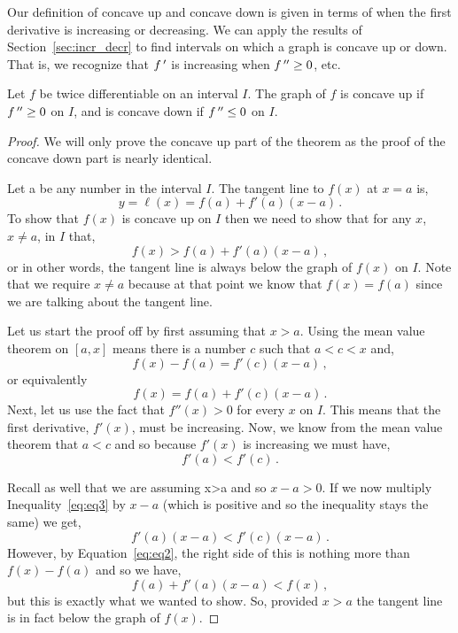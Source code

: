 Our definition of concave up and concave down is given in terms of when the first derivative is increasing or decreasing. We can apply the results of Section~\ref{sec:incr_decr} to find intervals on which a graph is concave up or down. That is, we recognize that $f\,'$ is increasing when $f\,''\geq0$, etc. 

\pagebreak
\begin{theorem}\label{thm:concavity}
Let $f$ be twice differentiable on an interval $I$. The graph of $f$ is concave up if $f\,''\geq0$ on $I$, and is concave down if $f\,''\leq0$ on $I$. 
\end{theorem}

\ifanalysis

\begin{proof}
We will only prove the concave up part of the theorem as the proof of the concave down part is nearly identical.

Let a be any number in the interval $I$. The tangent line to $f(x)$ at $x=a$ is,
$$
y =\ell(x)= f\left( a \right) + f'\left( a \right)\left( {x - a} \right)\,.
$$
To show that $f(x)$ is concave up on $I$ then we need to show that for any $x$, $x\neq a$, in $I$ that,
$$
f\left( x \right) > f\left( a \right) + f'\left( a \right)\left( {x - a} \right)\,,
$$
or in other words, the tangent line is always below the graph of $f(x)$ on $I$. Note that we require $x\neq a$ because at that point we know that $f(x)=f(a)$ since we are talking about the tangent line.  

Let us start the proof off by first assuming that $x>a$. Using the mean value theorem on $[a,x]$ means there is a number $c$ such that $a<c<x$ and,
$$
f\left( x \right) - f\left( a \right) = f'\left( c \right)\left( {x - a} \right)\,,
$$
or equivalently
\begin{equation}
f\left( x \right) = f\left( a \right) + f'\left( c \right)\left( {x - a} \right)\,. \label{eq:eq2}
\end{equation}
Next, let us use the fact that $f''(x)>0$ for every $x$ on $I$. This means that the first derivative, $f'(x)$, must be increasing. Now, we know from the mean value theorem that $a<c$ and so because $f'(x)$
is increasing we must have, 
\begin{equation}
f'\left( a \right) < f'\left( c \right)\,. \label{eq:eq3} 
\end{equation}


Recall as well that we are assuming x>a and so $x-a>0$. If we now multiply Inequality~\eqref{eq:eq3} by $x-a$ (which is positive and so the inequality stays the same) we get,
$$
f'\left( a \right)\left( {x - a} \right) < f'\left( c \right)\left( {x - a} \right)\,.
$$
However, by Equation~\eqref{eq:eq2}, the right side of this is nothing more than $f(x)-f(a)$ and so we have,
$$
f\left( a \right) + f'\left( a \right)\left( {x - a} \right) < f\left( x \right)\,,
$$
but this is exactly what we wanted to show. So, provided $x>a$ the tangent line is in fact below the graph of $f(x)$. 


\end{proof}
